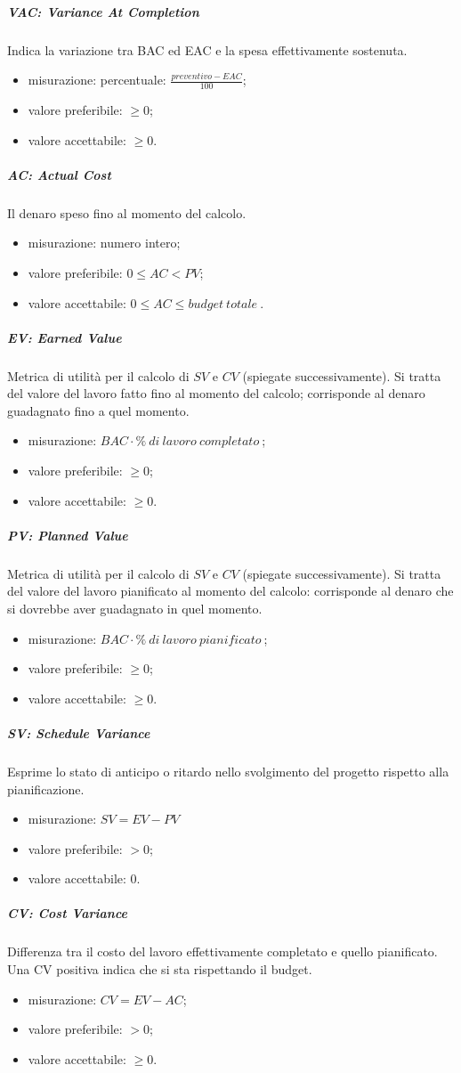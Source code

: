 			\subparagraph{VAC: Variance At Completion}
			Indica la variazione tra BAC ed EAC e la spesa effettivamente sostenuta.
			\begin{itemize}
				\item  misurazione: percentuale: $\frac{preventivo - EAC}{100}$;
				\item  valore preferibile: $\geq 0$;
				\item  valore accettabile: $\geq 0$.
			\end{itemize}
				
			\subparagraph{AC: Actual Cost}
			Il denaro speso fino al momento del calcolo.
			\begin{itemize}
				\item  misurazione: numero intero;
				\item  valore preferibile: $0 \leq AC < PV$;
				\item  valore accettabile: $0 \leq AC \leq budget\ totale\ $.
			\end{itemize}
		
			\subparagraph{EV: Earned Value}
			Metrica di utilità per il calcolo di $SV$ e $CV$ (spiegate successivamente). Si tratta del valore del lavoro fatto fino al momento del calcolo; corrisponde al denaro guadagnato fino a quel momento.
			\begin{itemize}
				\item  misurazione: $BAC \cdot \%\ di\ lavoro\ completato\ $;
				\item  valore preferibile: $ \geq 0$;
				\item  valore accettabile: $ \geq 0$.
			\end{itemize}
			\subparagraph{PV: Planned Value}
			Metrica di utilità per il calcolo di $SV$ e $CV$ (spiegate successivamente). Si tratta del valore del lavoro pianificato al momento del calcolo: corrisponde al denaro che si dovrebbe aver guadagnato in quel momento.
			\begin{itemize}
				\item  misurazione: $BAC \cdot \%\ di\ lavoro\ pianificato\ $;
				\item  valore preferibile: $ \geq 0$;
				\item  valore accettabile: $ \geq 0$.
			\end{itemize}			
			\subparagraph{SV: Schedule Variance}
			Esprime lo stato di anticipo o ritardo nello svolgimento del progetto rispetto alla pianificazione.
			\begin{itemize}
				\item misurazione: $SV = EV - PV$
				\item valore preferibile: $ > 0$;
				\item valore accettabile: 0.
			\end{itemize}
			\subparagraph{CV: Cost Variance}
			Differenza tra il costo del lavoro effettivamente completato e quello pianificato. Una CV positiva indica che si sta rispettando il budget.
			\begin{itemize}
				\item misurazione: $CV = EV - AC$;
				\item valore preferibile: $ > 0$;
				\item valore accettabile: $ \geq 0$.
			\end{itemize}

